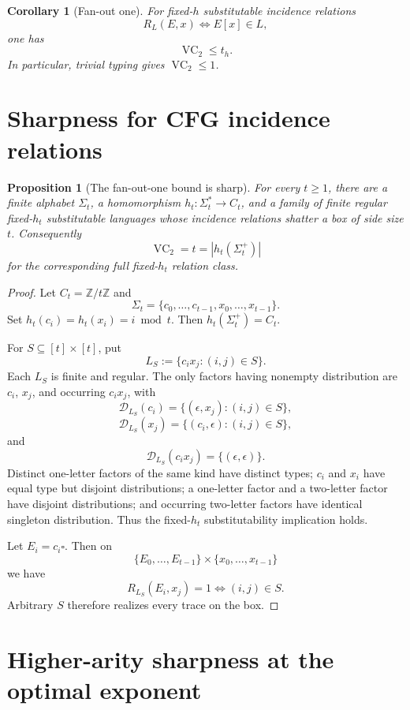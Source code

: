 \documentclass[11pt]{article}
\newtheorem{proposition}[theorem]{Proposition}
\newtheorem{corollary}[theorem]{Corollary}
\newcommand{\D}{\mathcal D}
\newcommand{\VC}{\operatorname{VC}}
\newcommand{\blank}{\square}
\begin{document}
\begin{corollary}[Fan-out one]\label{cor:cfg-upper}
For fixed-\(h\) substitutable incidence relations
\[
R_L(E,x)\Longleftrightarrow E[x]\in L,
\]
one has
\[
\VC_2\le t_h.
\]
In particular, trivial typing gives \(\VC_2\le1\).
\end{corollary}

\section{Sharpness for CFG incidence relations}

\begin{proposition}[The fan-out-one bound is sharp]\label{prop:sharp-cfg}
For every \(t\ge1\), there are a finite alphabet \(\Sigma_t\), a homomorphism
\(h_t:\Sigma_t^*\to C_t\), and a family of finite regular fixed-\(h_t\)
substitutable languages whose incidence relations shatter a box of side
size \(t\). Consequently
\[
\VC_2=t=|h_t(\Sigma_t^+)|
\]
for the corresponding full fixed-\(h_t\) relation class.
\end{proposition}

\begin{proof}
Let \(C_t=\mathbb Z/t\mathbb Z\) and
\[
\Sigma_t=\{c_0,\ldots,c_{t-1},x_0,\ldots,x_{t-1}\}.
\]
Set \(h_t(c_i)=h_t(x_i)=i\bmod t\). Then
\(h_t(\Sigma_t^+)=C_t\).

For \(S\subseteq[t]\times[t]\), put
\[
L_S:=\{c_i x_j:(i,j)\in S\}.
\]
Each \(L_S\) is finite and regular. The only factors having nonempty
distribution are \(c_i\), \(x_j\), and occurring \(c_i x_j\), with
\[
\D_{L_S}(c_i)=\{(\epsilon,x_j):(i,j)\in S\},
\]
\[
\D_{L_S}(x_j)=\{(c_i,\epsilon):(i,j)\in S\},
\]
and
\[
\D_{L_S}(c_i x_j)=\{(\epsilon,\epsilon)\}.
\]
Distinct one-letter factors of the same kind have distinct types; \(c_i\)
and \(x_i\) have equal type but disjoint distributions; a one-letter factor
and a two-letter factor have disjoint distributions; and occurring
two-letter factors have identical singleton distribution. Thus the
fixed-\(h_t\) substitutability implication holds.

Let \(E_i=c_i\blank\). Then on
\[
\{E_0,\ldots,E_{t-1}\}\times\{x_0,\ldots,x_{t-1}\}
\]
we have
\[
R_{L_S}(E_i,x_j)=1\Longleftrightarrow(i,j)\in S.
\]
Arbitrary \(S\) therefore realizes every trace on the box.
\end{proof}

\section{Higher-arity sharpness at the optimal exponent}
\end{document}
